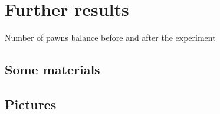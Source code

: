 \newpage



\section{ Further results}
\vspace{.2in}


\begin{table}[H]
\caption{Number of pawns balance before and after the experiment}
\label{num_pawns_bal}
\begin{center}
\scriptsize{}
\end{center}
 \scriptsize 
\end{table}

\subsection{Some materials}

\vspace{.1in}

\subsection{Pictures}

